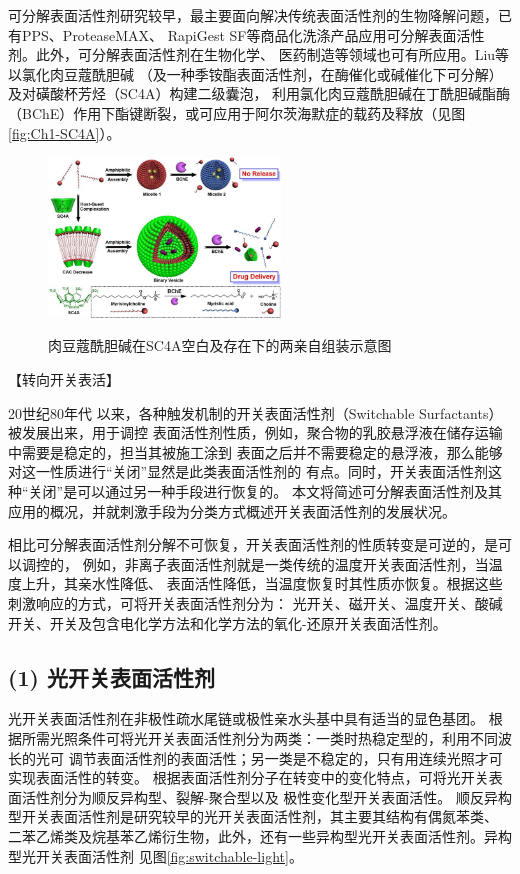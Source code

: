 \documentclass[bachelor,fandolfonts,replaceperiod]{jnuthesis} %
\begin{document}
    可分解表面活性剂研究较早，最主要面向解决传统表面活性剂的生物降解问题，已有PPS、ProteaseMAX、
    RapiGest SF等商品化洗涤产品应用可分解表面活性剂。此外，可分解表面活性剂在生物化学、
    医药制造等领域也可有所应用\cite{hellberg2000}。Liu等\cite{guo2012}以氯化肉豆蔻酰胆碱
    （及一种季铵酯表面活性剂，在酶催化或碱催化下可分解）及对磺酸杯芳烃（SC4A）构建二级囊泡，
    利用氯化肉豆蔻酰胆碱在丁酰胆碱酯酶（BChE）作用下酯键断裂，或可应用于阿尔茨海默症的载药及释放（见图\ref{fig:Ch1-SC4A}）。
    
    \begin{figure}[htbp]
        \centering
        \includegraphics[width= 0.55\textwidth]{Figure/Ch1-SC4A}\\
        \caption{肉豆蔻酰胆碱在SC4A空白及存在下的两亲自组装示意图}\label{fig:cleavale-SC4A}
    \end{figure}
    
   【转向开关表活】
    
    20世纪80年代
    以来，各种触发机制的开关表面活性剂（Switchable Surfactants）被发展出来，用于调控
    表面活性剂性质，例如，聚合物的乳胶悬浮液在储存运输中需要是稳定的，担当其被施工涂到
    表面之后并不需要稳定的悬浮液，那么能够对这一性质进行“关闭”显然是此类表面活性剂的
    有点\cite{jessop2012}。同时，开关表面活性剂这种“关闭”是可以通过另一种手段进行恢复的。
    本文将简述可分解表面活性剂及其应用的概况，并就刺激手段为分类方式概述开关表面活性剂的发展状况。
    
    相比可分解表面活性剂分解不可恢复，开关表面活性剂的性质转变是可逆的，是可以调控的，
    例如，非离子表面活性剂就是一类传统的温度开关表面活性剂，当温度上升，其亲水性降低、
    表面活性降低，当温度恢复时其性质亦恢复。根据这些刺激响应的方式，可将开关表面活性剂分为：
    光开关、磁开关、温度开关、酸碱开关、开关及包含电化学方法和化学方法的氧化-还原开关表面活性剂\cite{秦勇2009}。
    
    \subsection*{(1) 光开关表面活性剂}
    光开关表面活性剂在非极性疏水尾链或极性亲水头基中具有适当的显色基团\cite{张冤帝2017}。
    根据所需光照条件可将光开关表面活性剂分为两类：一类时热稳定型的，利用不同波长的光可
    调节表面活性剂的表面活性；另一类是不稳定的，只有用连续光照才可实现表面活性的转变。
    根据表面活性剂分子在转变中的变化特点，可将光开关表面活性剂分为顺反异构型、裂解-聚合型以及
    极性变化型开关表面活性\cite{张冤帝2017,李云霞2011}。
    顺反异构型开关表面活性剂是研究较早的光开关表面活性剂，其主要其结构有偶氮苯类、
    二苯乙烯类及烷基苯乙烯衍生物，此外，还有一些异构型光开关表面活性剂。异构型光开关表面活性剂
    见图\ref{fig:switchable-light}\cite{张冤帝2017,karthaus1996,shang2003,吕湘亮2018}。
    
\end{document}
